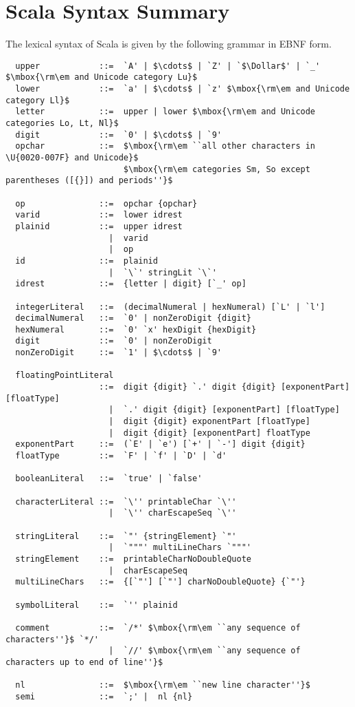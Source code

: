
\chapter{Scala Syntax Summary}\label{sec:syntax}

The lexical syntax of Scala is given by the following grammar in EBNF
form.

{\small
\begin{lstlisting}
  upper            ::=  `A' | $\cdots$ | `Z' | `$\Dollar$' | `_' $\mbox{\rm\em and Unicode category Lu}$
  lower            ::=  `a' | $\cdots$ | `z' $\mbox{\rm\em and Unicode category Ll}$
  letter           ::=  upper | lower $\mbox{\rm\em and Unicode categories Lo, Lt, Nl}$
  digit            ::=  `0' | $\cdots$ | `9'
  opchar           ::=  $\mbox{\rm\em ``all other characters in \U{0020-007F} and Unicode}$
                        $\mbox{\rm\em categories Sm, So except parentheses ([{}]) and periods''}$

  op               ::=  opchar {opchar} 
  varid            ::=  lower idrest
  plainid          ::=  upper idrest
                     |  varid
                     |  op
  id               ::=  plainid
                     |  `\`' stringLit `\`'
  idrest           ::=  {letter | digit} [`_' op]

  integerLiteral   ::=  (decimalNumeral | hexNumeral) [`L' | `l']
  decimalNumeral   ::=  `0' | nonZeroDigit {digit}
  hexNumeral       ::=  `0' `x' hexDigit {hexDigit}
  digit            ::=  `0' | nonZeroDigit
  nonZeroDigit     ::=  `1' | $\cdots$ | `9'

  floatingPointLiteral 
                   ::=  digit {digit} `.' digit {digit} [exponentPart] [floatType]
                     |  `.' digit {digit} [exponentPart] [floatType]
                     |  digit {digit} exponentPart [floatType]
                     |  digit {digit} [exponentPart] floatType
  exponentPart     ::=  (`E' | `e') [`+' | `-'] digit {digit}
  floatType        ::=  `F' | `f' | `D' | `d'

  booleanLiteral   ::=  `true' | `false'

  characterLiteral ::=  `\'' printableChar `\''
                     |  `\'' charEscapeSeq `\''

  stringLiteral    ::=  `"' {stringElement} `"'
                     |  `"""' multiLineChars `"""'
  stringElement    ::=  printableCharNoDoubleQuote 
                     |  charEscapeSeq
  multiLineChars   ::=  {[`"'] [`"'] charNoDoubleQuote} {`"'}

  symbolLiteral    ::=  `'' plainid

  comment          ::=  `/*' $\mbox{\rm\em ``any sequence of characters''}$ `*/'
                     |  `//' $\mbox{\rm\em ``any sequence of characters up to end of line''}$

  nl               ::=  $\mbox{\rm\em ``new line character''}$
  semi             ::=  `;' |  nl {nl}       
\end{lstlisting}}


